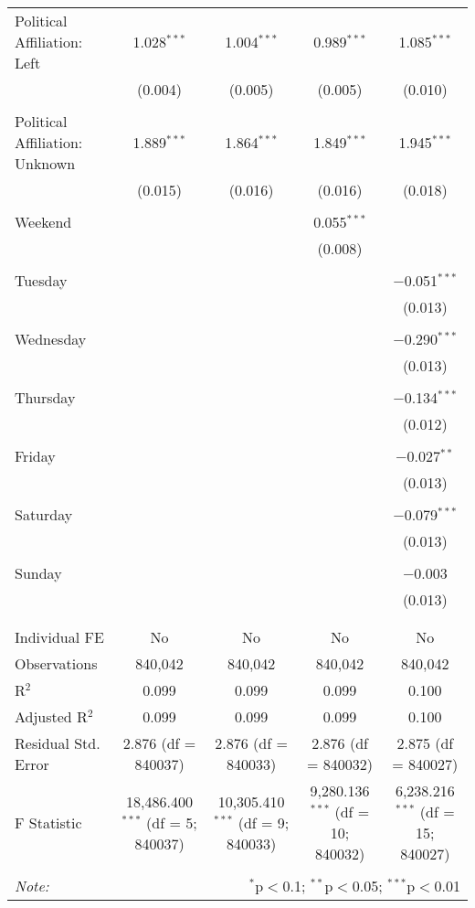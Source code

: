 \documentclass[
]{article}
\begin{document}
\begin{table}[!htbp]
{\begin{tabular}{@{\extracolsep{5pt}}lcccc}
 Political Affiliation: Left & 1.028$^{***}$ & 1.004$^{***}$ & 0.989$^{***}$ & 1.085$^{***}$ \\ 
  & (0.004) & (0.005) & (0.005) & (0.010) \\ 
  & & & & \\ 
 Political Affiliation: Unknown & 1.889$^{***}$ & 1.864$^{***}$ & 1.849$^{***}$ & 1.945$^{***}$ \\ 
  & (0.015) & (0.016) & (0.016) & (0.018) \\ 
  & & & & \\ 
 Weekend &  &  & 0.055$^{***}$ &  \\ 
  &  &  & (0.008) &  \\ 
  & & & & \\ 
 Tuesday &  &  &  & $-$0.051$^{***}$ \\ 
  &  &  &  & (0.013) \\ 
  & & & & \\ 
 Wednesday &  &  &  & $-$0.290$^{***}$ \\ 
  &  &  &  & (0.013) \\ 
  & & & & \\ 
 Thursday &  &  &  & $-$0.134$^{***}$ \\ 
  &  &  &  & (0.012) \\ 
  & & & & \\ 
 Friday &  &  &  & $-$0.027$^{**}$ \\ 
  &  &  &  & (0.013) \\ 
  & & & & \\ 
 Saturday &  &  &  & $-$0.079$^{***}$ \\ 
  &  &  &  & (0.013) \\ 
  & & & & \\ 
 Sunday &  &  &  & $-$0.003 \\ 
  &  &  &  & (0.013) \\ 
  & & & & \\ 
\hline \\[-1.8ex] 
Individual FE & No & No & No & No \\ 
Observations & 840,042 & 840,042 & 840,042 & 840,042 \\ 
R$^{2}$ & 0.099 & 0.099 & 0.099 & 0.100 \\ 
Adjusted R$^{2}$ & 0.099 & 0.099 & 0.099 & 0.100 \\ 
Residual Std. Error & 2.876 (df = 840037) & 2.876 (df = 840033) & 2.876 (df = 840032) & 2.875 (df = 840027) \\ 
F Statistic & 18,486.400$^{***}$ (df = 5; 840037) & 10,305.410$^{***}$ (df = 9; 840033) & 9,280.136$^{***}$ (df = 10; 840032) & 6,238.216$^{***}$ (df = 15; 840027) \\ 
\hline 
\hline \\[-1.8ex] 
\textit{Note:}  & \multicolumn{4}{r}{$^{*}$p$<$0.1; $^{**}$p$<$0.05; $^{***}$p$<$0.01} \\ 
\end{tabular}
} 
\end{table} 
\newpage
\end{document}
